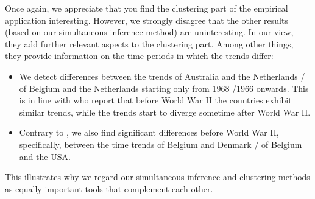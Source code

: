\documentclass[a4paper,12pt]{article}
\begin{document}
\begin{enumerate}[label=\arabic*.,leftmargin=0.6cm]
Once again, we appreciate that you find the clustering part of the empirical application interesting. However, we strongly disagree that the other results (based on our simultaneous inference method) are uninteresting. In our view, they add further relevant aspects to the clustering part. Among other things, they provide information on the time periods in which the trends differ:
\begin{itemize}[itemsep=0pt,topsep=0pt,leftmargin=1.5cm]
\item We detect differences between the trends of Australia and the Netherlands / of Belgium and the Netherlands starting only from 1968 /1966  onwards. This is in line with \cite{Knoll2017} who report that before World War II the countries exhibit similar trends, while the trends start to diverge sometime after World War II.
\item Contrary to \cite{Knoll2017}, we also find significant differences before World War II, specifically, between the time trends of Belgium and Denmark / of Belgium and the USA.
\end{itemize}
This illustrates why we regard our simultaneous inference and clustering methods as equally important tools that complement each other. 






\end{enumerate}
\end{document}
